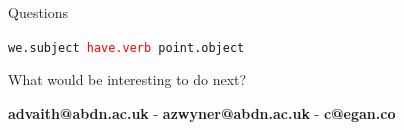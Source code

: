 \documentclass{beamer}
\begin{document}
  \begin{frame}{Questions}
    \begin{center}
      \texttt{we.subject \textcolor{red}{have.verb} point.object}

      What would be interesting to do next?

      \vfill
      \begin{center}
        \textbf{advaith@abdn.ac.uk} - \textbf{azwyner@abdn.ac.uk} -  \textbf{c@egan.co}
      \end{center}
    \end{center}
  \end{frame}

  {
	\begin{frame}[plain]
	\end{frame}
  }
\end{document}
